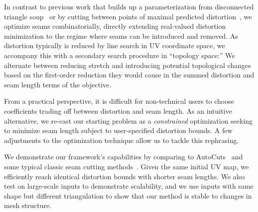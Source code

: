 In contrast to previous work that builds up a parameterization from disconnected triangle soup~\cite{Poranne2017Autocuts} or by cutting between points of maximal predicted distortion~\cite{Gu2002Geometry,Sheffer2002Seamster}, we optimize seams combinatorially, directly extending real-valued distortion minimization to the regime where seams can be introduced and removed. As distortion typically is reduced by line search in UV coordinate space, we accompany this with a secondary search procedure in ``topology space:'' We alternate between reducing stretch and introducing potential topological changes based on the first-order reduction they would cause in the summed distortion and seam length terms of the objective. %

From a practical perspective, it is difficult for non-technical users to choose coefficients trading off between distortion and seam length.  As an intuitive alternative, we re-cast our starting problem as a \emph{constrained} optimization seeking to minimize seam length subject to user-specified distortion bounds.  A few adjustments to the optimization technique allow us to tackle this rephrasing.

We demonstrate our framework's capabilities by comparing to AutoCuts~\cite{Poranne2017Autocuts} and some typical classic seam cutting methods~\cite{Gu2002Geometry,Sheffer2002Seamster}. %
Given the same initial UV map, we efficiently reach identical distortion bounds with shorter seam lengths. We also test on large-scale inputs to demonstrate scalability, and we use inputs with same shape but different triangulation to show that our method is stable to changes in mesh structure.

